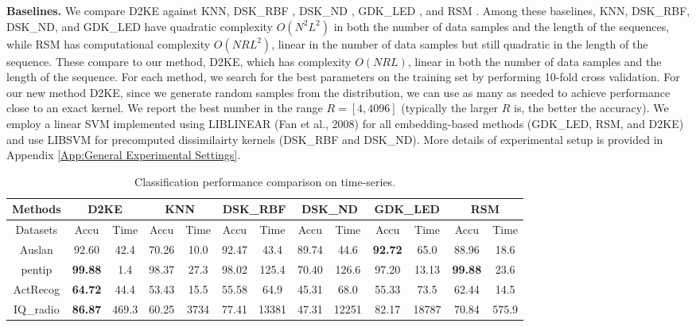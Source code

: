 \documentclass{article}
\newcommand{\1}{\mathbf{1}}
\begin{document}
\textbf{Baselines.} We compare D2KE against KNN, DSK\_RBF \cite{haasdonk2004learning}, DSK\_ND \cite{haasdonk2004learning}, GDK\_LED \cite{pekalska2001generalized}, and RSM \cite{pekalska2001generalized}. Among these baselines, KNN, DSK\_RBF, DSK\_ND, and GDK\_LED have quadratic complexity $O(N^2L^2)$ in both the number of data samples and the length of the sequences, while RSM has computational complexity $O(NRL^2)$, linear in the number of data samples but still quadratic in the length of the sequence. These compare to our method, D2KE, which has complexity $O(NRL)$, linear in both the number of data samples and the length of the sequence. For each method, we search for the best parameters on the training set by performing 10-fold cross validation. For our new method D2KE, since we generate random samples from the distribution, we can use as many as needed to achieve performance close to an exact kernel. We report the best number in the range $R = [4, 4096]$ (typically the larger $R$ is, the better the accuracy). We employ a linear SVM implemented using LIBLINEAR (Fan et al., 2008) for all embedding-based methods (GDK\_LED, RSM, and D2KE) and use LIBSVM \cite{chang2011libsvm} for precomputed dissimilairty kernels (DSK\_RBF and DSK\_ND). More details of experimental setup is provided in Appendix \ref{App:General Experimental Settings}. 

\begin{table*}[th]
\centering
\caption{Classification performance comparison on time-series.} 
\label{tb:comp_time-series}
\scriptsize
\newcommand{\Bd}[1]{\textbf{#1}}
\vspace{-4mm}
\begin{center}
    \begin{tabular}{ c cc cc cc cc cc cc}
    \hline
    \multicolumn{1}{c}{Methods}
    & \multicolumn{2}{c}{D2KE} 
    & \multicolumn{2}{c}{KNN}
    & \multicolumn{2}{c}{DSK\_RBF} 
    & \multicolumn{2}{c}{DSK\_ND} 
    & \multicolumn{2}{c}{GDK\_LED}
    & \multicolumn{2}{c}{RSM} \\ \hline 
	\multicolumn{1}{c}{Datasets} & Accu & Time & Accu & Time & Accu & Time & Accu & Time & Accu & Time & Accu & Time \\ \hline
	Auslan  & 92.60 & 42.4 & 70.26 & 10.0 & 92.47 & 43.4 & 89.74 & 44.6 & \Bd{92.72} & 65.0 & 88.96 & 18.6\\
	pentip & \Bd{99.88} & 1.4 & 98.37 & 27.3 & 98.02 & 125.4 & 70.40 & 126.6 & 97.20 & 13.13 & \Bd{99.88} & 23.6 \\
	ActRecog & \Bd{64.72} & 44.4 & 53.43 & 15.5 & 55.58 & 64.9 & 45.31 & 68.0 & 55.33 & 73.5 & 62.44 & 14.5 \\ 
    IQ\_radio & \Bd{86.87} & 469.3 & 60.25 & 3734 & 77.41 & 13381 & 47.31 & 12251 & 82.17 & 18787 & 70.84 & 575.9 \\ \hline
    \end{tabular}   
\end{center}
\vspace{-4mm}
\end{table*}
\end{document}
